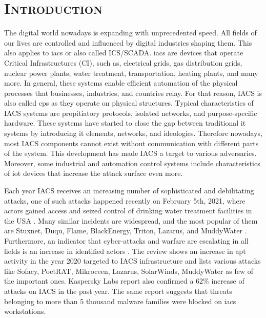 \chapter{\textsc{Introduction}}\label{ch:introduction}

The digital world nowadays is expanding with unprecedented speed. All fields of our lives are controlled and influenced by digital industries shaping them. This also applies to \gls*{iacs} or also called ICS/SCADA. \gls*{iacs} are devices that operate Critical Infrastructures (CI), such as, electrical grids, gas distribution grids, nuclear power plants, water treatment, transportation, heating plants, and many more. In general, these systems enable efficient automation of the physical processes that businesses, industries, and countries relay. For that reason, IACS is also called \gls*{cps} as they operate on physical structures. Typical characteristics of IACS systems are propitiatory protocols, isolated networks, and purpose-specific hardware. These systems have started to close the gap between traditional \gls*{it} systems by introducing \gls*{it} elements, networks, and ideologies. Therefore nowadays, most IACS components cannot exist without communication with different parts of the system. This development has made IACS a target to various adversaries. Moreover, some industrial and automation control systems include characteristics of \gls*{iot} devices that increase the attack surface even more.

Each year IACS receives an increasing number of sophisticated and debilitating attacks, one of such attacks happened recently on February 5th, 2021, where actors gained access and seized control of drinking water treatment facilities in the USA \parencite{WEB-01-usa-water-treatement-atack}. Many similar incidents are widespread, and the most popular of them are Stuxnet, Duqu, Flame, BlackEnergy, Triton, Lazarus, and MuddyWater \parencite{01-surway, 68-kaspersky-ics-cert-apt-attacks-on-industrial-companies-in-2020-en}. Furthermore, an indicator that cyber-attacks and warfare are escalating in all fields is an increase in identified actors \parencite{WEB-02-fireeye-apt-list, WEB-03-mitre-apt-list}. The review  \parencite{68-kaspersky-ics-cert-apt-attacks-on-industrial-companies-in-2020-en} shows an increase in \gls*{apt} activity in the year 2020 targeted to IACS infrastructure and lists various attacks like Sofacy, PoetRAT, Mikroceen, Lazarus, SolarWinds, MuddyWater as few of the important ones. Kaspersky Labs report \parencite{67-kaspersky-threat-landscape-for-industrial-automation-systems-statistics-for-h2-2020-en} also confirmed a 62\% increase of attacks on IACS in the past year. The same report suggests that threats belonging to more than 5 thousand malware families were blocked on \gls*{iacs} workstations.

